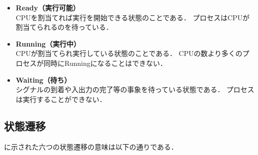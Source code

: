 \begin{itemize}
\item {\bf Ready（実行可能）} \\
CPUを割当てれば実行を開始できる状態のことである．
プロセスはCPUが割当てられるのを待っている．
\item {\bf Running（実行中）} \\
CPUが割当てられ実行している状態のことである．
CPUの数より多くのプロセスが同時にRunningになることはできない．
\item {\bf Waiting（待ち）} \\
シグナルの到着や入出力の完了等の事象を待っている状態である．
プロセスは実行することができない．
\end{itemize}


\subsection{状態遷移}
に示された六つの状態遷移の意味は以下の通りである．

